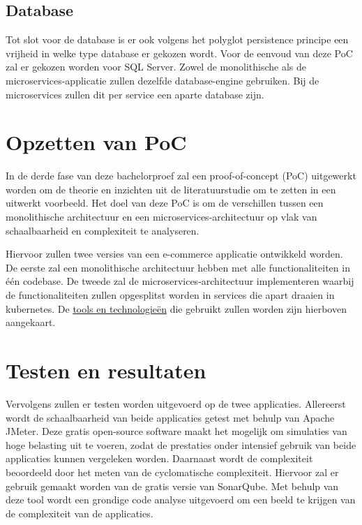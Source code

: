 \subsection{Database}

Tot slot voor de database is er ook volgens het polyglot persistence principe een vrijheid in welke type database er gekozen wordt. Voor de eenvoud van deze PoC zal er gekozen worden voor SQL Server. Zowel de monolithische als de microservices-applicatie zullen dezelfde database-engine gebruiken. Bij de microservices zullen dit per service een aparte database zijn.

\section{Opzetten van PoC}

In de derde fase van deze bachelorproef zal een proof-of-concept (PoC) uitgewerkt worden om de theorie en inzichten uit de literatuurstudie om te zetten in een uitwerkt voorbeeld. Het doel van deze PoC is om de verschillen tussen een monolithische architectuur en een microservices-architectuur op vlak van schaalbaarheid en complexiteit te analyseren.

Hiervoor zullen twee versies van een e-commerce applicatie ontwikkeld worden. De eerste zal een monolithische architectuur hebben met alle functionaliteiten in één codebase. De tweede zal de microservices-architectuur implementeren waarbij de functionaliteiten zullen opgesplitst worden in services die apart draaien in kubernetes. De \hyperref[tools_en_technologieën]{tools en technologieën} die gebruikt zullen worden zijn hierboven aangekaart.

\section{Testen en resultaten}

Vervolgens zullen er testen worden uitgevoerd op de twee applicaties. Allereerst wordt de schaalbaarheid van beide applicaties getest met behulp van Apache JMeter. Deze gratis open-source software maakt het mogelijk om simulaties van hoge belasting uit te voeren, zodat de prestaties onder intensief gebruik van beide applicaties kunnen vergeleken worden. Daarnaast wordt de complexiteit beoordeeld door het meten van de cyclomatische complexiteit. Hiervoor zal er gebruik gemaakt worden van de gratis versie van SonarQube. Met behulp van deze tool wordt een grondige code analyse uitgevoerd om een beeld te krijgen van de complexiteit van de applicaties.

